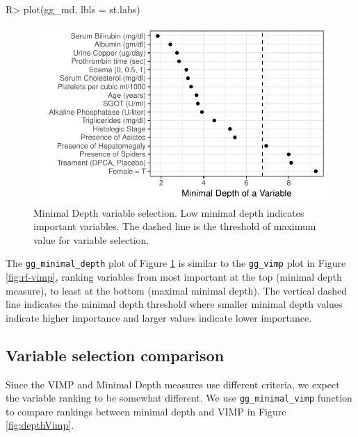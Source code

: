 \documentclass[article, nojss]{jss}
\begin{document}
\begin{Schunk}
\begin{Sinput}
R> plot(gg_md, lbls = st.labs)
\end{Sinput}
\begin{figure}[!htb]

{\centering \includegraphics{rfs-mindepth-plot-1}

}

\caption[Minimal Depth variable selection]{Minimal Depth variable selection. Low minimal depth indicates important variables. The dashed line is the threshold of maximum value for variable selection.}\label{fig:mindepth-plot}
\end{figure}
\end{Schunk}

The \texttt{gg\_minimal\_depth} plot of Figure \ref{fig:mindepth-plot}
is similar to the \texttt{gg\_vimp} plot in Figure \ref{fig:rf-vimp},
ranking variables from most important at the top (minimal depth
measure), to least at the bottom (maximal minimal depth). The vertical
dashed line indicates the minimal depth threshold where smaller minimal
depth values indicate higher importance and larger values indicate lower
importance.

\subsection{Variable selection
comparison}\label{variable-selection-comparison}

Since the VIMP and Minimal Depth measures use different criteria, we
expect the variable ranking to be somewhat different. We use
\texttt{gg\_minimal\_vimp} function to compare rankings between minimal
depth and VIMP in Figure \ref{fig:depthVimp}.
\end{document}
